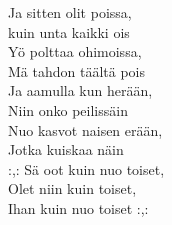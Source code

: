         Ja sitten olit poissa, \\
        kuin unta kaikki ois \\
        Yö polttaa ohimoissa, \\
        Mä tahdon täältä pois \\
        Ja aamulla kun herään, \\
        Niin onko peilissäin \\
        Nuo kasvot naisen erään, \\
        Jotka kuiskaa näin \\
        :,: Sä oot kuin nuo toiset, \\
        Olet niin kuin toiset, \\
        Ihan kuin nuo toiset :,: \\
